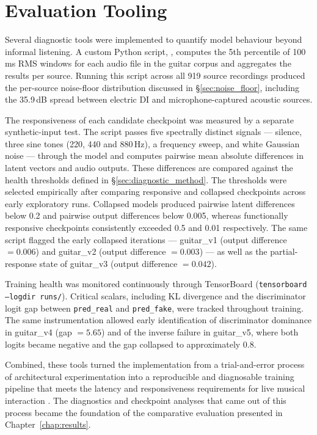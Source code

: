\documentclass[a4paper,11pt,oneside,openany]{book}
\newcommand{\repobase}{https://github.com/jofregeli/voice-to-guitar-brave}
\newcommand{\repocommit}{36ddd4c7767be9e0b364fb0b6af7480256bd34bb}
\newcommand{\repofile}[1]{\href{\repobase/blob/\repocommit/\detokenize{#1}}{\texttt{\detokenize{#1}}}}
\begin{document}
\section{Evaluation Tooling}\label{sec:eval_tooling}

Several diagnostic tools were implemented to quantify model behaviour beyond informal listening. A custom Python script, \repofile{scripts/analyze_noise_floor.py}, computes the 5th percentile of 100\,ms RMS windows for each audio file in the guitar corpus and aggregates the results per source. Running this script across all 919 source recordings produced the per-source noise-floor distribution discussed in \S\ref{sec:noise_floor}, including the 35.9\,dB spread between electric DI and microphone-captured acoustic sources.

The responsiveness of each candidate checkpoint was measured by a separate synthetic-input test. The script passes five spectrally distinct signals --- silence, three sine tones (220, 440 and 880\,Hz), a frequency sweep, and white Gaussian noise --- through the model and computes pairwise mean absolute differences in latent vectors and audio outputs. These differences are compared against the health thresholds defined in \S\ref{sec:diagnostic_method}. The thresholds were selected empirically after comparing responsive and collapsed checkpoints across early exploratory runs. Collapsed models produced pairwise latent differences below 0.2 and pairwise output differences below 0.005, whereas functionally responsive checkpoints consistently exceeded 0.5 and 0.01 respectively. The same script flagged the early collapsed iterations --- guitar\_v1 (output difference $=0.006$) and guitar\_v2 (output difference $=0.003$) --- as well as the partial-response state of guitar\_v3 (output difference $=0.042$).

Training health was monitored continuously through TensorBoard (\texttt{tensorboard --logdir runs/}). Critical scalars, including KL divergence and the discriminator logit gap between \texttt{pred\_real} and \texttt{pred\_fake}, were tracked throughout training. The same instrumentation allowed early identification of discriminator dominance in guitar\_v4 (gap $=5.65$) and of the inverse failure in guitar\_v5, where both logits became negative and the gap collapsed to approximately 0.8.

Combined, these tools turned the implementation from a trial-and-error process of architectural experimentation into a reproducible and diagnosable training pipeline that meets the latency and responsiveness requirements for live musical interaction \parencite{wessel2002intimate}. The diagnostics and checkpoint analyses that came out of this process became the foundation of the comparative evaluation presented in Chapter~\ref{chap:results}.
\end{document}
